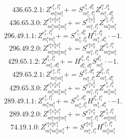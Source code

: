 \documentclass[letterpaper,10pt,fleqn,leqno,onecolumn]{article}
\begin{document}
\begin{equation} \;\;\;\;\;\;  436.65.2.1: Z^{e_{1}^{b},l_{1}^{a}}_{m_{1}^{a}m_{1}^{b}}+=S^{e_{1}^{b},d_{1}^{a}}_{m_{1}^{b},l_{2}^{a}}Z^{l_{1}^{a},l_{2}^{a}}_{m_{1}^{a},d_{1}^{a}} \end{equation}
\begin{equation} \;\;\;\;\;\;  436.65.3.0: Z^{e_{1}^{a}e_{2}^{a}e_{1}^{b}}_{m_{1}^{a}m_{2}^{a}m_{1}^{b}}+=S^{e_{1}^{a}e_{2}^{a}}_{m_{1}^{a},l_{1}^{a}}Z^{e_{1}^{b},l_{1}^{a}}_{m_{2}^{a}m_{1}^{b}} \end{equation}
\begin{equation} \;\;\;\;\;\;  296.49.1.1: Z^{e_{1}^{b},l_{1}^{a}}_{m_{1}^{a}m_{1}^{b}}+=S^{e_{1}^{b},d_{1}^{a}}_{m_{1}^{b},l_{2}^{a}}H^{l_{1}^{a},l_{2}^{a}}_{m_{1}^{a},d_{1}^{a}}\cdot -1. \end{equation}
\begin{equation} \;\;\;\;\;\;  296.49.2.0: Z^{e_{1}^{a}e_{2}^{a}e_{1}^{b}}_{m_{1}^{a}m_{2}^{a}m_{1}^{b}}+=S^{e_{1}^{a}e_{2}^{a}}_{m_{1}^{a},l_{1}^{a}}Z^{e_{1}^{b},l_{1}^{a}}_{m_{2}^{a}m_{1}^{b}} \end{equation}
\begin{equation} \;\;\;\;\;\;  429.65.1.2: Z^{l_{1}^{b},l_{1}^{a}}_{m_{1}^{b},d_{1}^{a}}+=H^{l_{1}^{b},l_{1}^{a}}_{d_{1}^{b},d_{1}^{a}}S^{d_{1}^{b}}_{m_{1}^{b}}\cdot -1. \end{equation}
\begin{equation} \;\;\;\;\;\;  429.65.2.1: Z^{e_{1}^{b},l_{1}^{a}}_{m_{1}^{a}m_{1}^{b}}+=S^{e_{1}^{b},d_{1}^{a}}_{m_{1}^{a},l_{1}^{b}}Z^{l_{1}^{b},l_{1}^{a}}_{m_{1}^{b},d_{1}^{a}} \end{equation}
\begin{equation} \;\;\;\;\;\;  429.65.3.0: Z^{e_{1}^{a}e_{2}^{a}e_{1}^{b}}_{m_{1}^{a}m_{2}^{a}m_{1}^{b}}+=S^{e_{1}^{a}e_{2}^{a}}_{m_{1}^{a},l_{1}^{a}}Z^{e_{1}^{b},l_{1}^{a}}_{m_{2}^{a}m_{1}^{b}} \end{equation}
\begin{equation} \;\;\;\;\;\;  289.49.1.1: Z^{e_{1}^{b},l_{1}^{a}}_{m_{1}^{a}m_{1}^{b}}+=S^{e_{1}^{b},d_{1}^{a}}_{m_{1}^{a},l_{1}^{b}}H^{l_{1}^{b},l_{1}^{a}}_{m_{1}^{b},d_{1}^{a}}\cdot -1. \end{equation}
\begin{equation} \;\;\;\;\;\;  289.49.2.0: Z^{e_{1}^{a}e_{2}^{a}e_{1}^{b}}_{m_{1}^{a}m_{2}^{a}m_{1}^{b}}+=S^{e_{1}^{a}e_{2}^{a}}_{m_{1}^{a},l_{1}^{a}}Z^{e_{1}^{b},l_{1}^{a}}_{m_{2}^{a}m_{1}^{b}} \end{equation}
\begin{equation} \;\;\;\;\;\;  74.19.1.0: Z^{e_{1}^{a}e_{2}^{a}e_{1}^{b}}_{m_{1}^{a}m_{2}^{a}m_{1}^{b}}+=S^{e_{1}^{a}e_{2}^{a}}_{m_{1}^{a},l_{1}^{a}}H^{e_{1}^{b},l_{1}^{a}}_{m_{2}^{a}m_{1}^{b}} \end{equation}
\end{document}
